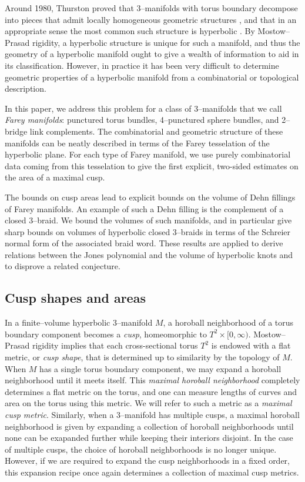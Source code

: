 \documentclass[11pt]{amsart}
\theoremstyle{plain}
\theoremstyle{definition}
\begin{document}
Around 1980, Thurston proved that 3--manifolds with torus boundary
decompose into pieces that admit locally homogeneous geometric structures
\cite{thurston:survey}, and that in an appropriate sense the most
common such structure is hyperbolic \cite{thurston:notes}.  By
Mostow--Prasad rigidity, a hyperbolic structure is unique for such a
manifold, and thus the geometry of a hyperbolic manifold ought to give
a wealth of information to aid in its classification.  However, in
practice it has been very difficult to determine geometric properties
of a hyperbolic manifold from a combinatorial or topological
description.


In this paper, we address this problem for a class of 3--manifolds
that we call \emph{Farey manifolds}: punctured torus bundles,
4--punctured sphere bundles, and 2--bridge link complements.  The
combinatorial and geometric structure of these manifolds can be neatly
described in terms of the Farey tesselation of the hyperbolic
plane. For each type of Farey manifold, we use purely combinatorial
data coming from this tesselation to give the first explicit,
two-sided estimates on the area of a maximal cusp.


The bounds on cusp areas lead to explicit bounds on the volume of Dehn
fillings of Farey manifolds.  An example of such a Dehn filling is the
complement of a closed 3--braid.  We bound the volumes of such
manifolds, and in particular give sharp bounds on volumes of
hyperbolic closed 3--braids in terms of the Schreier normal form of
the associated braid word.  These results are applied to derive
relations between the Jones polynomial and the volume of hyperbolic
knots and to disprove a related conjecture.


\subsection{Cusp shapes and areas}

In a finite--volume hyperbolic 3--manifold $M$, a horoball
neighborhood of a torus boundary component becomes a \emph{cusp},
homeomorphic to $T^2\times[0,\infty)$.  Mostow--Prasad rigidity
implies that each cross-sectional torus $T^2$ is endowed with a flat
metric, or \emph{cusp shape}, that is determined up to similarity by
the topology of $M$.  When $M$ has a single torus boundary component,
we may expand a horoball neighborhood until it meets itself.  This
\emph{maximal horoball neighborhood} completely determines a flat
metric on the torus, and one can measure lengths of curves and area on
the torus using this metric.  We will refer to such a metric as a
\emph{maximal cusp metric}.  Similarly, when a 3--manifold has
multiple cusps, a maximal horoball neighborhood is given by expanding
a collection of horoball neighborhoods until none can be exapanded
further while keeping their interiors disjoint.  In the case of
multiple cusps, the choice of horoball neighborhoods is no longer
unique.  However, if we are required to expand the cusp neighborhoods 
in a fixed order, this expansion recipe once again determines a collection 
of maximal cusp metrics.
\end{document}
